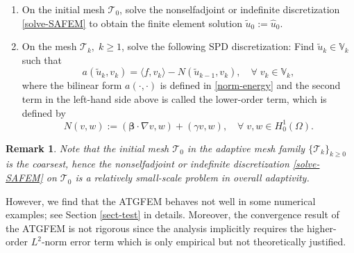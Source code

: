 \documentclass[preprint,times]{elsarticle}%
\newtheorem{remark}{Remark}[section]
\numberwithin{algorithm}{section}
\numberwithin{equation}{section}
\newcommand{\vbeta}{\boldsymbol{\beta}}
\newcommand{\hu}{\hat{u}}
\newcommand{\tu}{\tilde{u}}
\newcommand{\mcT}{\mathcal{T}}
\newcommand{\mbV}{\mathbb{V}}
\def\geq{\geqslant}
\begin{document}
\begin{enumerate}
	\itemsep = 0pt \parskip = 0pt
	\item On the initial mesh $\mcT_0$, solve the nonselfadjoint or indefinite discretization \eqref{solve-SAFEM} to obtain the finite element solution $\tu_0 := \hu_0$. 
	\item On the mesh $\mcT_k, \; k \geq 1$, solve the following SPD discretization: Find $\tu_k \in \mbV_k$ such that 
	\begin{equation}\label{solve-ATGFEM}
		a(\tu_k,v_k) = \langle f,v_k \rangle - N(\tu_{k-1},v_k), \quad \forall \; v_k \in \mbV_k, 
	\end{equation}
where the bilinear form $a(\cdot,\cdot)$ is defined in \eqref{norm-energy} and the second term in the left-hand side above is called the lower-order term, which is defined by 
\begin{equation}\label{bilinear-form-N}
	N(v,w) := (\vbeta \cdot \nabla v,w) + (\gamma v,w), \quad \forall \; v,w \in H_0^1(\Omega). 
\end{equation}
\end{enumerate}
\begin{remark}\label{rem-small-scale}
Note that the initial mesh $\mcT_0$ in the adaptive mesh family $\{\mcT_k\}_{k \geq 0}$ is the coarsest, hence the nonselfadjoint or indefinite discretization \eqref{solve-SAFEM} on $\mcT_0$ is a relatively small-scale problem in overall adaptivity. 
\end{remark}

However, we find that the ATGFEM behaves not well in some numerical examples; see Section \ref{sect-test} in details. Moreover, the convergence result of the ATGFEM is not rigorous since the analysis implicitly requires the higher-order $L^2$-norm error term which is only empirical but not theoretically justified.
\end{document}
